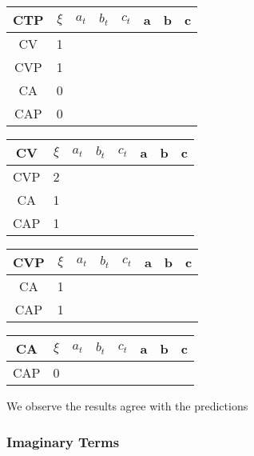 \documentclass[twocolumn]{article}
\begin{document}
\begin{table}[H]
	\begin{tabular}{|c|c|c|c|c|c|c|c|}
		\hline
		CTP & $\xi $& $a_t$ & $b_t$ & $c_t$ & a & b & c \\
		\hline
		CV & 1 &   &   &   &   &   &   \\
		\hline
		CVP & 1 &   &   &   &   &   &   \\
		\hline
		CA & 0 &   &   &   &   &   &   \\
		\hline
		CAP & 0 &   &   &   &   &   &   \\
		\hline
	\end{tabular}
\end{table}

\begin{table}[H]
	\begin{tabular}{|c|c|c|c|c|c|c|c|}
		\hline
		CV & $\xi $& $a_t$ & $b_t$ & $c_t$ & a & b & c \\
		\hline
		CVP & 2  &   &   &   &   &   &   \\
		\hline
		CA & 1 &   &   &   &   &   &   \\
		\hline
		CAP & 1 &   &   &   &   &   &   \\
		\hline
	\end{tabular}
\end{table}


\begin{table}[H]
	\begin{tabular}{|c|c|c|c|c|c|c|c|}
		\hline
		CVP & $\xi $& $a_t$ & $b_t$ & $c_t$ & a & b & c \\
		\hline
		CA & 1 &   &   &   &   &   &   \\
		\hline
		CAP & 1 &   &   &   &   &   &   \\
		\hline
	\end{tabular}
\end{table}

\begin{table}[H]
	\begin{tabular}{|c|c|c|c|c|c|c|c|}
		\hline
		CA & $\xi $& $a_t$ & $b_t$ & $c_t$ & a & b & c \\
		\hline
		CAP & 0 &   &   &   &   &   &   \\
		\hline
	\end{tabular}
\end{table}

We observe the results agree with the predictions

\subsubsection{Imaginary Terms}
\end{document}

